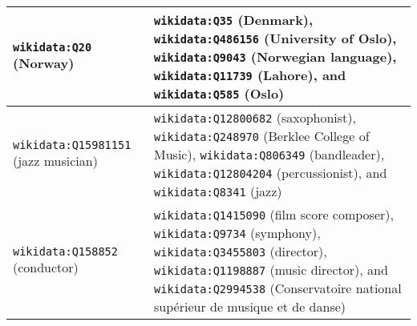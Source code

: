 \documentclass[preprint,5p]{elsarticle}
\begin{document}
\begin{table*}[h!]
\begin{center}
\begin{tabular}{|L{2.7cm}|L{11.5cm}|}
      {\texttt{wikidata:Q20}} (Norway) & \texttt{wikidata:Q35} (Denmark), \texttt{wikidata:Q486156} (University of Oslo), \texttt{wikidata:Q9043} (Norwegian language), \texttt{wikidata:Q11739} (Lahore), and \texttt{wikidata:Q585} (Oslo) \\ \hline

      {\texttt{wikidata:Q15981151}} (jazz musician) & \texttt{wikidata:Q12800682} (saxophonist), \texttt{wikidata:Q248970} (Berklee College of Music), \texttt{wikidata:Q806349} (bandleader), \texttt{wikidata:Q12804204} (percussionist), and \texttt{wikidata:Q8341} (jazz) \\ \hline
      
       {\texttt{wikidata:Q158852}} (conductor) & \texttt{wikidata:Q1415090} (film score composer), \texttt{wikidata:Q9734} (symphony), \texttt{wikidata:Q3455803} (director), \texttt{wikidata:Q1198887} (music director), and \texttt{wikidata:Q2994538} (Conservatoire national sup\'{e}rieur de musique et de danse) \\ \hline
    
    \end{tabular}
    
    \label{table:NearestNeighbours}
  \end{center}
\end{table*}
\end{document}
